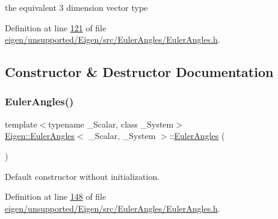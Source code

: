 the equivalent 3 dimension vector type 

Definition at line \hyperlink{eigen_2unsupported_2_eigen_2src_2_euler_angles_2_euler_angles_8h_source_l00121}{121} of file \hyperlink{eigen_2unsupported_2_eigen_2src_2_euler_angles_2_euler_angles_8h_source}{eigen/unsupported/\+Eigen/src/\+Euler\+Angles/\+Euler\+Angles.\+h}.



\subsection{Constructor \& Destructor Documentation}
\mbox{\label{class_eigen_1_1_euler_angles_a47be9344fbd4a5b34df45486cfaf1e2b}} 
\subsubsection{\texorpdfstring{Euler\+Angles()}{EulerAngles()}\hspace{0.1cm}{\footnotesize\ttfamily [1/12]}}
{\footnotesize\ttfamily template$<$typename \+\_\+\+Scalar, class \+\_\+\+System$>$ \\
\hyperlink{class_eigen_1_1_euler_angles}{Eigen\+::\+Euler\+Angles}$<$ \+\_\+\+Scalar, \+\_\+\+System $>$\+::\hyperlink{class_eigen_1_1_euler_angles}{Euler\+Angles} (\begin{DoxyParamCaption}{ }\end{DoxyParamCaption})\hspace{0.3cm}{\ttfamily [inline]}}

Default constructor without initialization. 

Definition at line \hyperlink{eigen_2unsupported_2_eigen_2src_2_euler_angles_2_euler_angles_8h_source_l00148}{148} of file \hyperlink{eigen_2unsupported_2_eigen_2src_2_euler_angles_2_euler_angles_8h_source}{eigen/unsupported/\+Eigen/src/\+Euler\+Angles/\+Euler\+Angles.\+h}.

\mbox{\label{class_eigen_1_1_euler_angles_a765135b6e5d35248517b4268046840b6}} 
